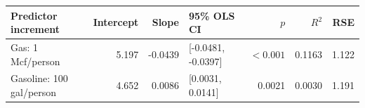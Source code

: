 \begin{tabular}{lrrlrrr}
\toprule
Predictor increment & Intercept & Slope & 95\% OLS CI & $p$ & $R^2$ & RSE \\
\midrule
Gas: 1 Mcf/person & 5.197 & -0.0439 & [-0.0481, -0.0397] & $<0.001$ & 0.1163 & 1.122 \\
Gasoline: 100 gal/person & 4.652 & 0.0086 & [0.0031, 0.0141] & 0.0021 & 0.0030 & 1.191 \\
\bottomrule
\end{tabular}
